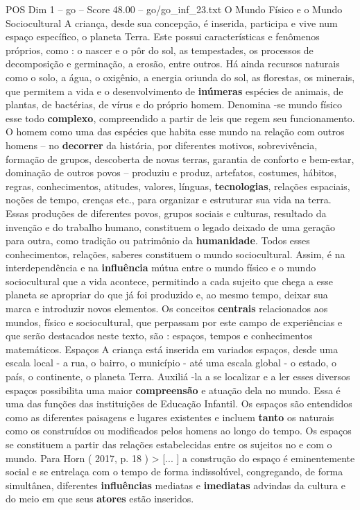 \begin{textsample}{POS Dim 1 – go – Score 48.00 – go/go\_inf\_23.txt}
O Mundo Físico e o Mundo Sociocultural A criança, desde sua concepção, é inserida, participa e vive num espaço específico, o planeta Terra.
Este possui características e fenômenos próprios, como : o nascer e o pôr do sol, as tempestades, os processos de decomposição e germinação, a erosão, entre outros.
Há ainda recursos naturais como o solo, a água, o oxigênio, a energia oriunda do sol, as florestas, os minerais, que permitem a vida e o desenvolvimento de \textbf{inúmeras} espécies de animais, de plantas, de bactérias, de vírus e do próprio homem.
Denomina -se mundo físico esse todo \textbf{complexo}, compreendido a partir de leis que regem seu funcionamento.
O homem como uma das espécies que habita esse mundo na relação com outros homens – no \textbf{decorrer} da história, por diferentes motivos, sobrevivência, formação de grupos, descoberta de novas terras, garantia de conforto e bem-estar, dominação de outros povos – produziu e produz, artefatos, costumes, hábitos, regras, conhecimentos, atitudes, valores, línguas, \textbf{tecnologias}, relações espaciais, noções de tempo, crenças etc., para organizar e estruturar sua vida na terra.
Essas produções de diferentes povos, grupos sociais e culturas, resultado da invenção e do trabalho humano, constituem o legado deixado de uma geração para outra, como tradição ou patrimônio da \textbf{humanidade}.
Todos esses conhecimentos, relações, saberes constituem o mundo sociocultural.
Assim, é na interdependência e na \textbf{influência} mútua entre o mundo físico e o mundo sociocultural que a vida acontece, permitindo a cada sujeito que chega a esse planeta se apropriar do que já foi produzido e, ao mesmo tempo, deixar sua marca e introduzir novos elementos.
Os conceitos \textbf{centrais} relacionados aos mundos, físico e sociocultural, que perpassam por este campo de experiências e que serão destacados neste texto, são : espaços, tempos e conhecimentos matemáticos.
Espaços A criança está inserida em variados espaços, desde uma escala local - a rua, o bairro, o município - até uma escala global - o estado, o país, o continente, o planeta Terra.
Auxiliá -la a se localizar e a ler esses diversos espaços possibilita uma maior \textbf{compreensão} e atuação dela no mundo.
Essa é uma das funções das instituições de Educação Infantil.
Os espaços são entendidos como as diferentes paisagens e lugares existentes e incluem \textbf{tanto} os naturais como os construídos ou modificados pelos homens ao longo do tempo.
Os espaços se constituem a partir das relações estabelecidas entre os sujeitos no e com o mundo.
Para Horn ( 2017, p. 18 ) > [... ] a construção do espaço é eminentemente social e se entrelaça com o tempo de forma indissolúvel, congregando, de forma simultânea, diferentes \textbf{influências} mediatas e \textbf{imediatas} advindas da cultura e do meio em que seus \textbf{atores} estão inseridos.

\end{textsample}
